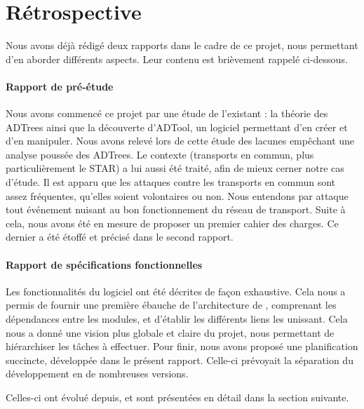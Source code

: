 \section{Rétrospective}
	\label{sec:retrospective}

	Nous avons déjà rédigé deux rapports dans le cadre de ce projet, nous permettant d'en aborder différents aspects. Leur contenu est brièvement rappelé ci-dessous.

	\paragraph{Rapport de pré-étude} Nous avons commencé ce projet par une étude de l'existant : la théorie des ADTrees ainsi que la découverte d'ADTool, un logiciel permettant d'en créer et d'en manipuler. Nous avons relevé lors de cette étude des lacunes empêchant une analyse poussée des ADTrees. Le contexte (transports en commun, plus particulièrement le STAR) a lui aussi été traité, afin de mieux cerner notre cas d'étude. Il est apparu que les attaques contre les transports en commun sont assez fréquentes, qu'elles soient volontaires ou non. Nous entendons par \og attaque \fg{} tout événement nuisant au bon fonctionnement du réseau de transport. Suite à cela, nous avons été en mesure de proposer un premier cahier des charges. Ce dernier a été étoffé et précisé dans le second rapport.

	\paragraph{Rapport de spécifications fonctionnelles} Les fonctionnalités du logiciel ont été décrites de façon exhaustive. Cela nous a permis de fournir une première ébauche de l'architecture de \glasir{}, comprenant les dépendances entre les modules, et d'établir les différents liens les unissant. Cela nous a donné une vision plus globale et claire du projet, nous permettant de hiérarchiser les tâches à effectuer. Pour finir, nous avons proposé une planification succincte, développée dans le présent rapport. Celle-ci prévoyait la séparation du développement en de nombreuses versions.

	Celles-ci ont évolué depuis, et sont présentées en détail dans la section suivante.